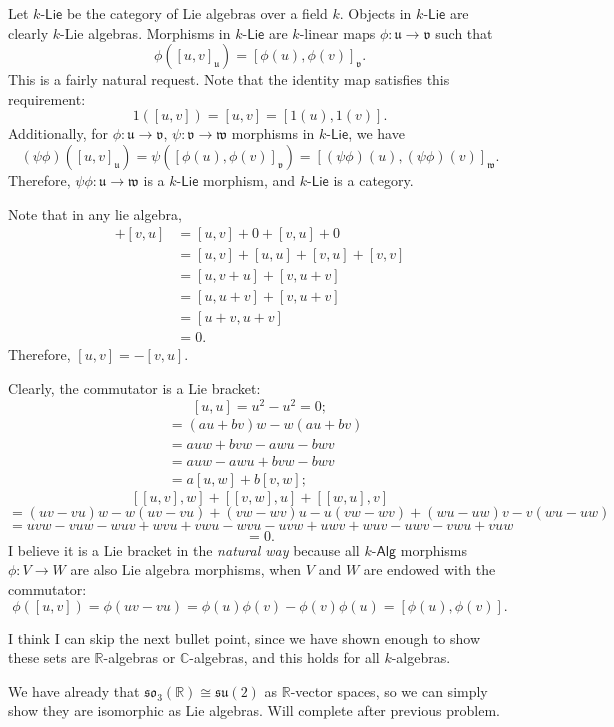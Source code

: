 \documentclass[11pt]{report}
\newcommand{\Alg}[1]{#1\text{-}\mathsf{Alg}}
\begin{document}
\begin{solution}
	Let $k$-$\mathsf{Lie} $ be the category of Lie algebras over a field $k$. Objects in $k$-$\mathsf{Lie} $ are clearly $k$-Lie algebras. Morphisms in $k$-$\mathsf{Lie} $ are $k$-linear maps $\phi : \mathfrak{u}  \to \mathfrak{v} $ such that
	\[
		\phi \left( [u,v]_{\mathfrak{u} }  \right) =[\phi (u),\phi (v)]_{\mathfrak{v} } 
	.\]
	This is a fairly natural request. Note that the identity map satisfies this requirement:
	\[
		1([u,v])=[u,v]=[1(u),1(v)]
	.\]
	Additionally, for $\phi : \mathfrak{u}  \to \mathfrak{v} $, $\psi : \mathfrak{v}  \to \mathfrak{w} $ morphisms in $k$-$\mathsf{Lie} $, we have
	\[
		(\psi \phi )([u,v]_{\mathfrak{u} } )=\psi \left( [\phi (u),\phi (v)]_{\mathfrak{v} }  \right) =\left[ (\psi \phi )(u),(\psi \phi )(v) \right]_{\mathfrak{w} } 
	.\]
	Therefore, $\psi \phi : \mathfrak{u}  \to \mathfrak{w} $ is a $k$-$\mathsf{Lie} $ morphism, and $k$-$\mathsf{Lie} $ is a category.

	Note that in any lie algebra,
	\begin{align*}
		[u,v]+[v,u]&=[u,v]+0+[v,u]+0\\
			   &=[u,v]+[u,u]+[v,u]+[v,v]\\
			   &=[u,v+u]+[v,u+v]\\
			   &=[u,u+v]+[v,u+v]\\
			   &=[u+v,u+v]\\
			   &=0
	.\end{align*}
	Therefore, $[u,v]=-[v,u]$.

	Clearly, the commutator is a Lie bracket:
	\[
		[u,u]=u^2-u^2=0
	;\]
	\begin{align*}
		[au+bv,w]&=(au+bv)w-w(au+bv)\\
			 &=auw+bvw-awu-bwv\\
			 &=auw-awu+bvw-bwv\\
			 &=a[u,w]+b[v,w]
	;\end{align*}
	\[
		[[u,v],w]+[[v,w],u]+[[w,u],v]
	\]
	\[
		=(uv-vu)w-w(uv-vu)+(vw-wv)u-u(vw-wv)+(wu-uw)v-v(wu-uw)
	\]
	\[
		=uvw-vuw-wuv+wvu+vwu-wvu-uvw+uwv+wuv-uwv-vwu+vuw
	\]
	\[
		=0
	.\]
	I believe it is a Lie bracket in the \emph{natural way} because all $\Alg{k}$ morphisms $\phi : V \to W$ are also Lie algebra morphisms, when $V$ and $W$ are endowed with the commutator:
	\[
		\phi ([u,v])=\phi (uv-vu)=\phi (u)\phi (v)-\phi (v)\phi (u)=[\phi (u),\phi (v)]
	.\]
	
	I think I can skip the next bullet point, since we have shown enough to show these sets are $\mathbb{R} $-algebras or $\mathbb{C} $-algebras, and this holds for all $k$-algebras.

	We have already that $\mathfrak{so}_3(\mathbb{R} )\cong \mathfrak{su} (2)$ as $\mathbb{R} $-vector spaces, so we can simply show they are isomorphic as Lie algebras. Will complete after previous problem.
\end{solution}
\end{document}
